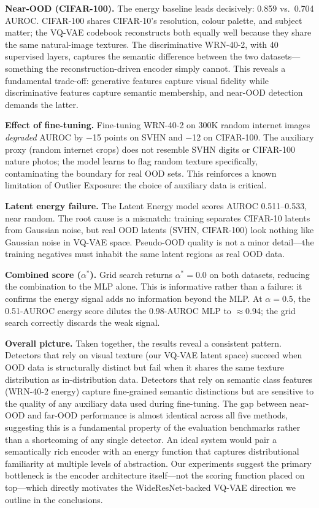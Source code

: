 \documentclass[10pt,twocolumn,letterpaper]{article}
\begin{document}
\textbf{Near-OOD (CIFAR-100).}
The energy baseline leads decisively: 0.859 vs.\ 0.704
AUROC.
CIFAR-100 shares CIFAR-10's resolution, colour palette, and
subject matter; the VQ-VAE codebook reconstructs both
equally well because they share the same natural-image
textures.
The discriminative WRN-40-2, with 40 supervised layers,
captures the semantic difference between the two
datasets---something the reconstruction-driven encoder
simply cannot.
This reveals a fundamental trade-off: generative features
capture visual fidelity while discriminative features
capture semantic membership, and near-OOD detection demands
the latter.

\textbf{Effect of fine-tuning.}
Fine-tuning WRN-40-2 on 300K random internet images
\emph{degraded} AUROC by $-$15 points on SVHN and $-$12
on CIFAR-100.
The auxiliary proxy (random internet crops) does not
resemble SVHN digits or CIFAR-100 nature photos; the model
learns to flag random texture specifically, contaminating
the boundary for real OOD sets.
This reinforces a known limitation of Outlier Exposure:
the choice of auxiliary data is critical.

\textbf{Latent energy failure.}
The Latent Energy model scores AUROC 0.511--0.533, near
random.
The root cause is a mismatch: training separates CIFAR-10
latents from Gaussian noise, but real OOD latents (SVHN,
CIFAR-100) look nothing like Gaussian noise in VQ-VAE
space.
Pseudo-OOD quality is not a minor detail---the training
negatives must inhabit the same latent regions as real OOD
data.

\textbf{Combined score ($\alpha^*$).}
Grid search returns $\alpha^*\!=\!0.0$ on both datasets,
reducing the combination to the MLP alone.
This is informative rather than a failure: it confirms the
energy signal adds no information beyond the MLP.
At $\alpha\!=\!0.5$, the 0.51-AUROC energy score dilutes
the 0.98-AUROC MLP to $\approx$0.94; the grid search
correctly discards the weak signal.

\textbf{Overall picture.}
Taken together, the results reveal a consistent pattern.
Detectors that rely on visual texture (our VQ-VAE latent
space) succeed when OOD data is structurally distinct but
fail when it shares the same texture distribution as
in-distribution data.
Detectors that rely on semantic class features (WRN-40-2
energy) capture fine-grained semantic distinctions but are
sensitive to the quality of any auxiliary data used during
fine-tuning.
The gap between near-OOD and far-OOD performance is almost
identical across all five methods, suggesting this is a
fundamental property of the evaluation benchmarks rather
than a shortcoming of any single detector.
An ideal system would pair a semantically rich encoder with
an energy function that captures distributional familiarity
at multiple levels of abstraction.
Our experiments suggest the primary bottleneck is the
encoder architecture itself---not the scoring function
placed on top---which directly motivates the WideResNet-backed
VQ-VAE direction we outline in the conclusions.
\end{document}
